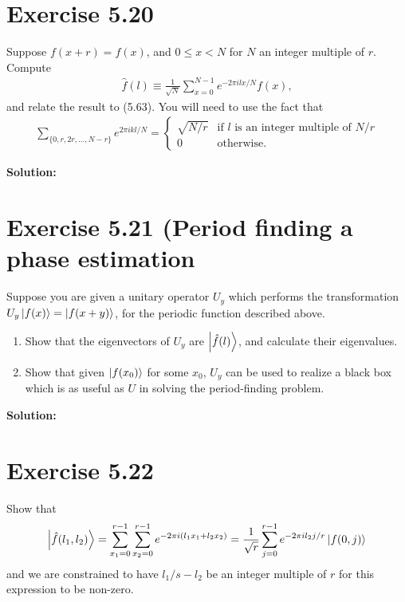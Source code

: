 \documentclass{book}
\begin{document}
\section*{Exercise 5.20}
    Suppose $f(x+r) = f(x)$, and $0\leq x<N$ for $N$ an integer multiple of $r$. Compute
    \begin{align}
        \hat{f}(l)\equiv \frac{1}{\sqrt{N}}\sum_{x=0}^{N-1} e^{-2\pi i l x/N} f(x),
    \end{align}
    and relate the result to (5.63). You will need to use the fact that
    \begin{align}
        \sum_{\{0,r,2r,...,N-r\}} e^{2\pi ikl/N} = 
        \begin{cases}
            \sqrt{N/r}  & \text{if $l$ is an integer multiple of $N/r$} \\
            0 & \text{otherwise}.
        \end{cases}
    \end{align}
    
    \textbf{Solution:}
    
\section*{Exercise 5.21 (Period finding a phase estimation}
    Suppose you are given a unitary operator $U_y$ which performs the transformation $U_y\ket{f(x)} = \ket{f(x+y)}$, for the periodic function described above.
    \begin{enumerate}
        \item Show that the eigenvectors of $U_y$ are $\ket{\hat{f}(l)}$, and calculate their eigenvalues.
        \item Show that given $\ket{f(x_0)}$ for some $x_0$, $U_y$ can be used to realize a black box which is as useful as $U$ in solving the period-finding problem.
    \end{enumerate}
    
    \textbf{Solution:}
    
\section*{Exercise 5.22}
    Show that
    \begin{align}
        \ket{\hat{f}(l_1,l_2)} = \sum_{x_1=0}^{r-1} \sum_{x_2 = 0}^{r-1}e^{-2\pi i(l_1x_1+l_2x_2)} = \frac{1}{\sqrt{r}} \sum_{j=0}^{r-1}e^{-2\pi i l_2 j /r}\ket{f(0,j)}
    \end{align}
    and we are constrained to have $l_1/s-l_2$ be an integer multiple of $r$ for this expression to be non-zero.
    
\end{document}
